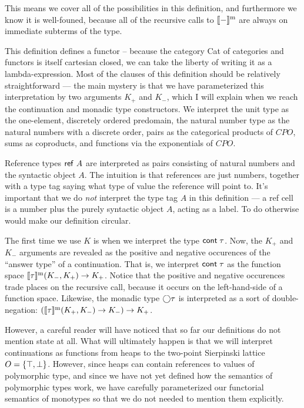 This means we cover all of the possibilities in this definition, and
furthermore we know it is well-founed, because all of the recursive
calls to $[\![{-}]\!]^{\mathrm{m}}$ are always on immediate subterms of the
type.

This definition defines a functor -- because the category Cat of
categories and functors is itself cartesian closed, we can take the
liberty of writing it as a lambda-expression. Most of the clauses of
this definition should be relatively straightforward --- the main
mystery is that we have parameterized this interpretation by two
arguments $K_+$ and $K_-$, which I will explain when we reach the
continuation and monadic type constructors.  We interpret the unit
type as the one-element, discretely ordered predomain, the natural
number type as the natural numbers with a discrete order, pairs as the
categorical products of $CPO$, sums as coproducts, and functions via
the exponentials of $CPO$.

Reference types $\mbox{\textsf{{ref }}}A$ are interpreted as pairs consisting of
natural numbers and the syntactic object $A$. The intuition is that
references are just numbers, together with a type tag saying what
type of value the reference will point to. It's important that we do 
\emph{not} interpret the type tag $A$ in this definition --- a ref cell
is a number plus the purely syntactic object $A$, acting as a label. 
To do otherwise would make our definition circular. 

The first time we use $K$ is when we interpret the type $\mbox{\textsf{{cont}}}\;{\tau}$.
Now, the $K_+$ and $K_-$ arguments are revealed as the positive and
negative occurences of the ``answer type'' of a continuation. That is,
we interpret $\mbox{\textsf{{cont}}}\;{\tau}$ as the function space
$[\![{\tau}]\!]^{\mathrm{m}}(K_-, K_+) \to K_+$.  Notice that the positive and
negative occurences trade places on the recursive call, because it
occurs on the left-hand-side of a function space. Likewise, the
monadic type $\bigcirc{\tau}$ is interpreted as a sort of
double-negation: $([\![{\tau}]\!]^{\mathrm{m}}(K_+, K_-) \to K_-) \to K_+$.

However, a careful reader will have noticed that so far our
definitions do not mention state at all. What will ultimately happen
is that we will interpret continuations as functions from heaps to the
two-point Sierpinski lattice $O = \{{\top, \bot}\}$. However, since
heaps can contain references to values of polymorphic type, and since
we have not yet defined how the semantics of polymorphic types work, we
have carefully parameterized our functorial semantics of monotypes so
that we do not needed to mention them explicitly. 

